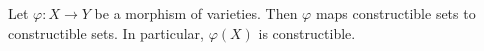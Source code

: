 Let $\varphi: X \rightarrow Y$ be a morphism of varieties. Then $\varphi$ maps constructible sets to constructible sets. In particular, $\varphi(X)$ is constructible.
